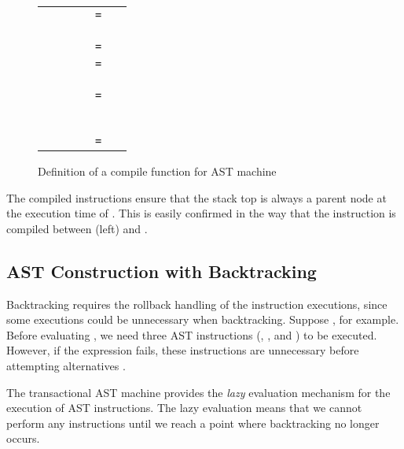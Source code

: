 \documentclass[JIP]{ipsj}
\begin{document}
\begin{figure}[tb]

\begin{tabular}{lrl} 
 &  \verb|      = | &   \\ 
 &  &   \\
 &  &   \\
 &  &   \\
 &  \verb|      = | &   \\ 
 &  \verb|      = | &   \\ 
 &  &   \\
 &  &   \\
 &  &   \\
 &  \verb|      = | &   \\ 
 &  &   \\ 
 &  &   \\ 
 &  &   \\ 
 &  &   \\
 &  &   \\
 &  &   \\
 &  \verb|      = | &   \\ 
\end{tabular} 
\caption{Definition of a compile function for AST machine}
\label{fig:tau}

\end{figure}

The compiled instructions ensure that the stack top is always a parent node at the execution time of . This is easily confirmed in the way that the  instruction is compiled between (\textrm{left}) and .

\subsection{AST Construction with Backtracking} \label{sec:sync}

Backtracking requires the rollback handling of the instruction executions, since some executions could be unnecessary when backtracking. Suppose , for example. Before evaluating , we need three AST instructions (, , and ) to be executed. However, if the expression  fails, these instructions are unnecessary before attempting alternatives .

The transactional AST machine provides the {\em lazy} evaluation mechanism for the execution of AST instructions. The lazy evaluation means that we cannot perform any instructions until we reach a point where backtracking no longer occurs.  
\end{document}
